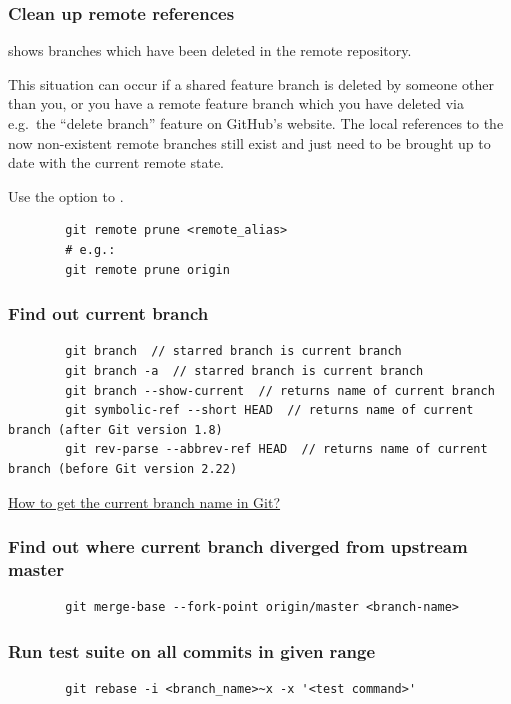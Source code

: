 \documentclass{git_course}
\begin{document}
\begin{frame}[fragile]
    \frametitle{Clean up remote references}

      shows branches which have been
    deleted in the remote repository.

    This situation can occur if a shared feature branch is deleted by
    someone other than you, or you have a remote feature branch which you
    have deleted via e.g.\ the ``delete branch'' feature on GitHub's website.
    The local references to the now non-existent remote branches still exist
    and just need to be brought up to date with the current remote state.

     Use the  option to .

    \begin{verbatim}
        git remote prune <remote_alias>
        # e.g.:
        git remote prune origin
    \end{verbatim}
\end{frame}

\begin{frame}[fragile]
    \frametitle{Find out current branch}
    \begin{verbatim}
        git branch  // starred branch is current branch
        git branch -a  // starred branch is current branch
        git branch --show-current  // returns name of current branch
        git symbolic-ref --short HEAD  // returns name of current branch (after Git version 1.8)
        git rev-parse --abbrev-ref HEAD  // returns name of current branch (before Git version 2.22)
    \end{verbatim}
    \href{https://stackoverflow.com/questions/6245570/how-to-get-the-current-branch-name-in-git}{How to get the current branch name in Git?}
\end{frame}

\begin{frame}[fragile]
    \frametitle{Find out where current branch diverged from upstream master}
    \begin{verbatim}
        git merge-base --fork-point origin/master <branch-name>
    \end{verbatim}
\end{frame}

\begin{frame}[fragile]
    \frametitle{Run test suite on all commits in given range}
    \begin{verbatim}
        git rebase -i <branch_name>~x -x '<test command>'
    \end{verbatim}
\end{frame}
\end{document}
